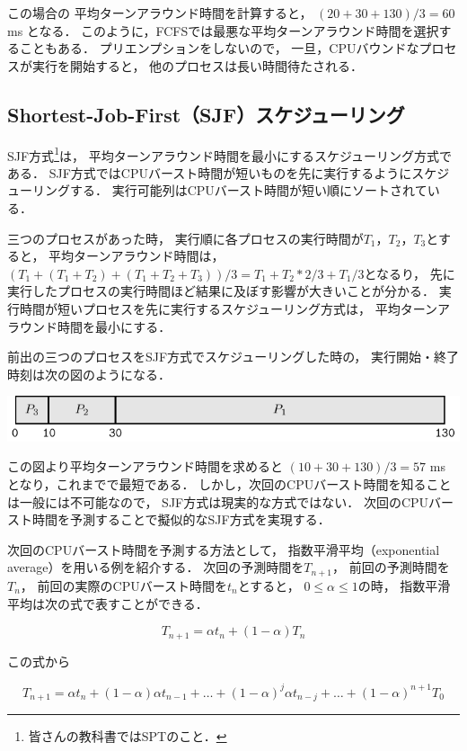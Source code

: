 この場合の
平均ターンアラウンド時間を計算すると，
$(20+30+130) / 3 = 60$ ms となる．
このように，FCFSでは最悪な平均ターンアラウンド時間を選択することもある．
プリエンプションをしないので，
一旦，CPUバウンドなプロセスが実行を開始すると，
他のプロセスは長い時間待たされる．

\subsection{Shortest-Job-First（SJF）スケジューリング}
SJF方式\footnote{皆さんの教科書ではSPTのこと．}は，
平均ターンアラウンド時間を最小にするスケジューリング方式である．
SJF方式ではCPUバースト時間が短いものを先に実行するようにスケジューリングする．
実行可能列はCPUバースト時間が短い順にソートされている．

三つのプロセスがあった時，
実行順に各プロセスの実行時間が$T_1$，$T_2$，$T_3$とすると，
平均ターンアラウンド時間は，
$(T_1+(T_1+T_2)+(T_1+T_2+T_3))/3=T_1+T_2*2/3+T_1/3$となるり，
先に実行したプロセスの実行時間ほど結果に及ぼす影響が大きいことが分かる．
実行時間が短いプロセスを先に実行するスケジューリング方式は，
平均ターンアラウンド時間を最小にする．

前出の三つのプロセスをSJF方式でスケジューリングした時の，
実行開始・終了時刻は次の図のようになる．

\begin{center}
\includegraphics[scale=1.0]{GanntChart/sjf1.pdf}
\end{center}

この図より平均ターンアラウンド時間を求めると
$(10+30+130)/3 = 57$ ms となり，これまでで最短である．
しかし，次回のCPUバースト時間を知ることは一般には不可能なので，
SJF方式は現実的な方式ではない．
次回のCPUバースト時間を予測することで擬似的なSJF方式を実現する．

次回のCPUバースト時間を予測する方法として，
指数平滑平均（exponential average）を用いる例を紹介する．
次回の予測時間を$T_{n+1}$，
前回の予測時間を$T_{n}$，
前回の実際のCPUバースト時間を$t_{n}$とすると，
$0 \le \alpha \le 1$の時，
指数平滑平均は次の式で表すことができる．

\[T_{n+1} = \alpha t_n + ( 1 - \alpha ) T_n\]

この式から

\[T_{n+1} = \alpha t_n + ( 1 - \alpha ) \alpha t_{n-1} + \dots +
 ( 1 - \alpha )^j \alpha t_{n-j} + \dots + (1 - \alpha )^{n+1} T_0 \]

